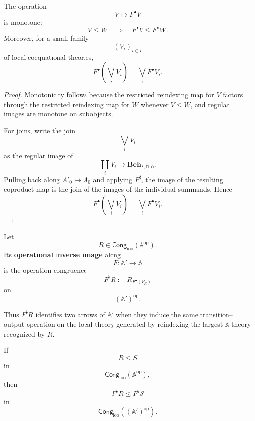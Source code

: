 \begin{lemma}
\label{lem:basic-properties-Fbullet}
    The operation
    \[
        V\longmapsto F^\bullet V
    \]
    is monotone:
    \[
        V\leq W
        \quad\Longrightarrow\quad
        F^\bullet V\leq F^\bullet W.
    \]
    Moreover, for a small family
    \[
        (V_i)_{i\in I}
    \]
    of local coequational theories,
    \[
        F^\bullet\left(\bigvee_i V_i\right)
        =
        \bigvee_i F^\bullet V_i.
    \]
\end{lemma}

\begin{proof}
    Monotonicity follows because the restricted reindexing map for \(V\) factors
    through the restricted reindexing map for \(W\) whenever \(V\leq W\), and
    regular images are monotone on subobjects.

    For joins, write the join
    \[
        \bigvee_i V_i
    \]
    as the regular image of
    \[
        \coprod_i V_i\to\mathbf{Beh}_{\mathbb A,\mathbb B,0}.
    \]
    Pulling back along \(A'_0\to A_0\) and applying \(F^\sharp\), the image of
    the resulting coproduct map is the join of the images of the individual
    summands. Hence
    \[
        F^\bullet\left(\bigvee_i V_i\right)
        =
        \bigvee_i F^\bullet V_i.
    \]
\end{proof}

\begin{definition}
\label{def:operational-inverse-image-congruence}
    Let
    \[
        R\in
        \mathsf{Cong}_{\mathrm{ioo}}(\mathbb A^{\mathrm{op}}).
    \]
    Its \textbf{operational inverse image} along
    \[
        F:\mathbb A'\to\mathbb A
    \]
    is the operation congruence
    \[
        F^\flat R
        :=
        R_{F^\bullet(V_R)}
    \]
    on
    \[
        (\mathbb A')^{\mathrm{op}}.
    \]
\end{definition}

Thus \(F^\flat R\) identifies two arrows of \(\mathbb A'\) when they induce the
same transition--output operation on the local theory generated by reindexing
the largest \(\mathbb A\)-theory recognized by \(R\).

\begin{lemma}
\label{lem:Fflat-monotone}
    If
    \[
        R\leq S
    \]
    in
    \[
        \mathsf{Cong}_{\mathrm{ioo}}(\mathbb A^{\mathrm{op}}),
    \]
    then
    \[
        F^\flat R\leq F^\flat S
    \]
    in
    \[
        \mathsf{Cong}_{\mathrm{ioo}}((\mathbb A')^{\mathrm{op}}).
    \]
\end{lemma}

